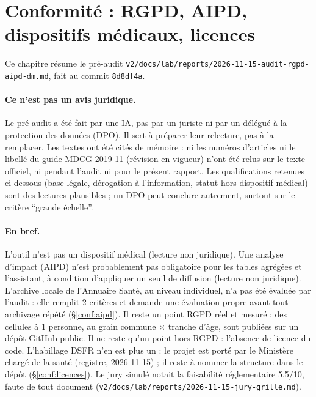 \begingroup\sloppy
\section{Conformité : RGPD, AIPD, dispositifs médicaux, licences}\label{sec:conformite-ref}\label{conf:sec}

Ce chapitre résume le pré-audit \texttt{v2/\allowbreak{}docs/\allowbreak{}lab/\allowbreak{}reports/\allowbreak{}2026-\allowbreak{}11-\allowbreak{}15-\allowbreak{}audit-\allowbreak{}rgpd-\allowbreak{}aipd-\allowbreak{}dm.md}, fait au commit \texttt{8d8df4a}.

\paragraph{Ce n'est pas un avis juridique.}
Le pré-audit a été fait par une IA, pas par un juriste ni par un délégué à la protection des données (DPO).
Il sert à préparer leur relecture, pas à la remplacer.
Les textes ont été cités de mémoire : ni les numéros d'articles ni le libellé du guide MDCG 2019-11 (révision en vigueur) n'ont été relus sur le texte officiel, ni pendant l'audit ni pour le présent rapport.
Les qualifications retenues ci-dessous (base légale, dérogation à l'information, statut hors dispositif médical) sont des lectures plausibles ; un DPO peut conclure autrement, surtout sur le critère \enquote{grande échelle}.

\paragraph{En bref.}
L'outil n'est pas un dispositif médical (lecture non juridique).
Une analyse d'impact (AIPD) n'est probablement pas obligatoire pour les tables agrégées et l'assistant, à condition d'appliquer un seuil de diffusion (lecture non juridique).
L'archive locale de l'Annuaire Santé, au niveau individuel, n'a pas été évaluée par l'audit : elle remplit 2 critères et demande une évaluation propre avant tout archivage répété (§\ref{conf:aipd}).
Il reste un point RGPD réel et mesuré : des cellules à 1 personne, au grain commune $\times$ tranche d'âge, sont publiées sur un dépôt GitHub public.
Il ne reste qu'un point hors RGPD : l'absence de licence du code.
L'habillage DSFR n'en est plus un : le projet est porté par le Ministère chargé de la santé (registre, 2026-11-15) ; il reste à nommer la structure dans le dépôt (§\ref{conf:licences}).
Le jury simulé notait la faisabilité réglementaire 5,5\suppose{}/10, faute de tout document (\texttt{v2/\allowbreak{}docs/\allowbreak{}lab/\allowbreak{}reports/\allowbreak{}2026-\allowbreak{}11-\allowbreak{}15-\allowbreak{}jury-\allowbreak{}grille.md}).

